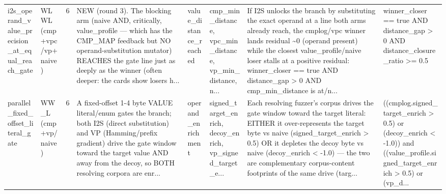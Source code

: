 \documentclass[7pt]{extarticle}
\begin{document}
{\begin{longtable}{@{}p{2.4cm}p{1.9cm}rp{4.3cm}p{1.5cm}p{1.7cm}p{4.6cm}p{3.0cm}@{}}
i2s\_\allowbreak operand\_\allowbreak value\_\allowbreak precision\_\allowbreak at\_\allowbreak equal\_\allowbreak reach\_\allowbreak gate & WLWL (cmp+vpc/vp+naive) & 6 & NEW (round 3). The blocking arm (naive AND, critically, value\_\allowbreak profile — which has the CMP\_\allowbreak MAP feedback but NO operand-substitution mutator) REACHES the gate line just as deeply as the winner (often deeper: the cards show losers h... & value\_\allowbreak distance\_\allowbreak reached & cmp\_\allowbreak min\_\allowbreak distance, vpc\_\allowbreak min\_\allowbreak distance, vp\_\allowbreak min\_\allowbreak distance, n... & If I2S unlocks the branch by substituting the exact operand at a line both arms already reach, the cmplog/vpc winner lands residual \textasciitilde{}0 (operand present) while the closest value\_\allowbreak profile/naive loser stalls at a positive residual: winner\_\allowbreak closer == true AND distance\_\allowbreak gap \textgreater{} 0 AND cmp\_\allowbreak min\_\allowbreak distance is at/n... & winner\_\allowbreak closer == true AND distance\_\allowbreak gap \textgreater{} 0 AND distance\_\allowbreak closure\_\allowbreak ratio \textgreater{}= 0.5\\
parallel\_\allowbreak fixed\_\allowbreak offset\_\allowbreak literal\_\allowbreak gate & WW\_\allowbreak L (cmp+vp/naive) & 6 & A fixed-offset 1-4 byte VALUE literal/enum gates the branch; both I2S (direct substitution) and VP (Hamming/prefix gradient) drive the gate window toward the target value AND away from the decoy, so BOTH resolving corpora are enr... & operand\_\allowbreak enrichment & signed\_\allowbreak target\_\allowbreak enrich, decoy\_\allowbreak enrich, vp\_\allowbreak signed\_\allowbreak target\_\allowbreak e... & Each resolving fuzzer's corpus drives the gate window toward the target literal: EITHER it over-represents the target byte vs naive (signed\_\allowbreak target\_\allowbreak enrich \textgreater{} 0.5) OR it depletes the decoy byte vs naive (decoy\_\allowbreak enrich \textless{} -1.0) — the two are complementary corpus-content footprints of the same drive (targ... & ((cmplog.signed\_\allowbreak target\_\allowbreak enrich \textgreater{} 0.5) or (decoy\_\allowbreak enrich \textless{} -1.0)) and ((value\_\allowbreak profile.signed\_\allowbreak target\_\allowbreak enrich \textgreater{} 0.5) or (vp\_\allowbreak d...\\

\end{longtable}}
\end{document}
